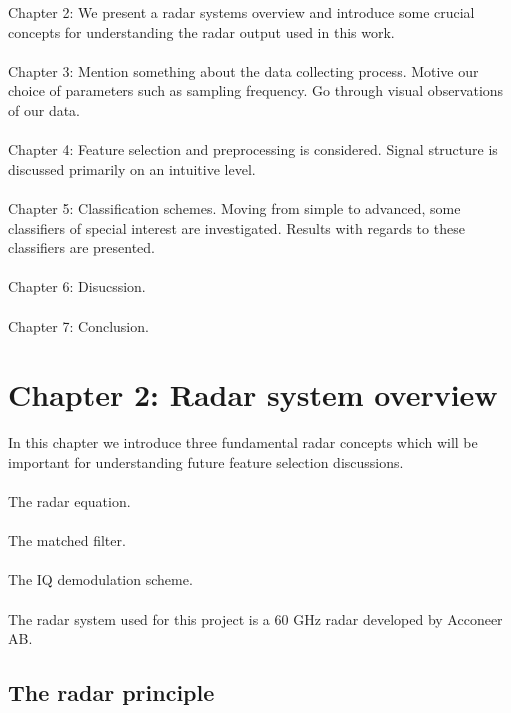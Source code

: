 \documentclass[a4paper, 12pt]{article}
\begin{document}
Chapter 2: We present a radar systems overview and introduce some crucial concepts for understanding the radar output used in this work. 
\\ \\
Chapter 3: Mention something about the data collecting process. Motive our choice of parameters such as sampling frequency. Go through visual observations of our data.
\\ \\
Chapter 4: Feature selection and preprocessing is considered. Signal structure is discussed primarily on an intuitive level. 
\\ \\
Chapter 5: Classification schemes. Moving from simple to advanced, some classifiers of special interest are investigated. Results with regards to these classifiers are presented.
\\ \\
Chapter 6: Disucssion.
\\ \\
Chapter 7: Conclusion.

\section{Chapter 2: Radar system overview}

In this chapter we introduce three fundamental radar concepts which will be important for understanding future feature selection discussions. 
\\ \\
The radar equation.
\\ \\
The matched filter.
\\ \\
The IQ demodulation scheme. 
\\ \\
The radar system used for this project is a 60 GHz radar developed by Acconeer AB.

\subsection{The radar principle}
\end{document}
